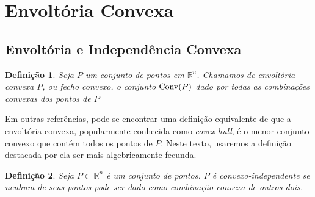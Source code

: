 \newtheorem{def:convex hull}{Definição}[section]
\newtheorem{def:independencia convexa}[def:convex hull]{Definição}
\newtheorem{def:simplex}[def:convex hull]{Definição}


\newtheorem{prop:redundancia}[def:convex hull]{Proposição}[section]



\newtheorem{lemma:afim}{Lema}[section]


\newtheorem{thm:caratheodory}{Teorema}[section]



\newtheorem{cor:caratheodory}{Corolário}[section]

\section{Envoltória Convexa}

\subsection{Envoltória e Independência Convexa}

\begin{def:convex hull}
	\label{def:convex hull}
	Seja $P$ um conjunto de pontos em $\mathbb{R}^n$. Chamamos de envoltória convexa $P$, ou fecho convexo, o conjunto $\mathrm{Conv}(P)$ dado
	por todas as combinações convexas dos pontos de $P$
\end{def:convex hull}

Em outras referências, pode-se encontrar uma definição equivalente de que a envoltória convexa, popularmente conhecida como \textit{covex hull},
é o menor conjunto convexo que contém todos os pontos de $P$. Neste texto, usaremos a definição
destacada por ela ser mais algebricamente fecunda.

\begin{def:independencia convexa}
	Seja $P \subset \mathbb{R}^n$ é um conjunto de pontos. $P$ é convexo-independente 
	se nenhum de seus pontos pode ser dado como combinação convexa de outros dois.
\end{def:independencia convexa}

